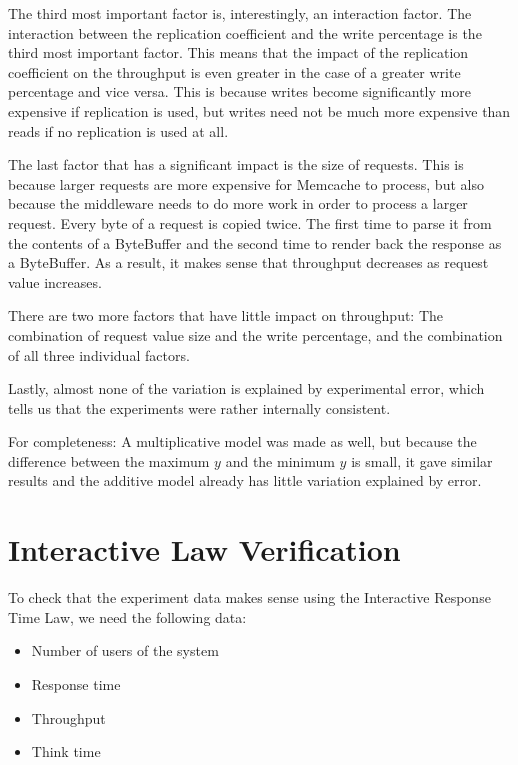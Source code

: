 \documentclass[11pt]{article}
\begin{document}
The third most important factor is, interestingly, an interaction factor.
The interaction between the replication coefficient and the write percentage is the third most important factor.
This means that the impact of the replication coefficient on the throughput is even greater in the case of a greater write percentage and vice versa.
This is because writes become significantly more expensive if replication is used, but writes need not be much more expensive than reads if no replication is used at all.

The last factor that has a significant impact is the size of requests.
This is because larger requests are more expensive for Memcache to process, but also because the middleware needs to do more work in order to process a larger request.
Every byte of a request is copied twice.
The first time to parse it from the contents of a ByteBuffer and the second time to render back the response as a ByteBuffer.
As a result, it makes sense that throughput decreases as request value increases.

There are two more factors that have little impact on throughput: The combination of request value size and the write percentage, and the combination of all three individual factors.

Lastly, almost none of the variation is explained by experimental error, which tells us that the experiments were rather internally consistent.

For completeness: A multiplicative model was made as well, but because the difference between the maximum $y$ and the minimum $y$ is small, it gave similar results and the additive model already has little variation explained by error.

\section{Interactive Law Verification}\label{sec:interactive-law}



To check that the experiment data makes sense using the Interactive Response Time Law, we need the following data:

\begin{itemize}
  \item Number of users of the system
  \item Response time
  \item Throughput
  \item Think time
\end{itemize}
\end{document}
